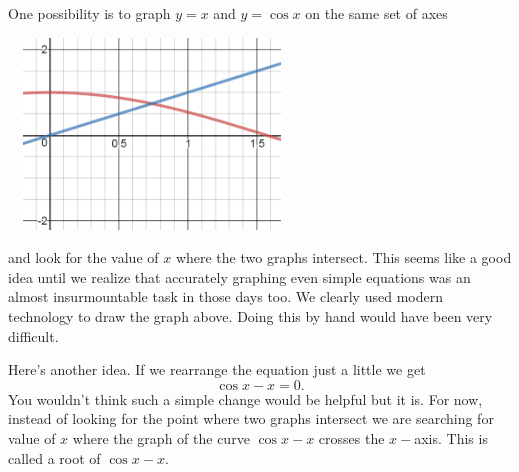 One possibility is to graph $y=x$ and $y=\cos x$ on the same set of
axes\\
\centerline{\includegraphics*[height=2in,width=3in]{Figures/cosxeqx}}
and look for the value of $x$ where the two graphs intersect. This
seems like a good idea until we realize that accurately graphing even
simple equations was an almost insurmountable task in those days
too. We clearly used modern technology to draw the graph above. Doing
this by hand would have been very difficult.

Here's another idea. If we rearrange the equation just a little we get 
$$
\cos x -x =0.
$$
You wouldn't think such a simple change would be helpful but it
is. For now, instead of looking for the point where two graphs
intersect we are searching for value of $x$  where the graph of the
curve $\cos x - x$ crosses the $x-$axis. This is called a root of
$\cos x -x.$ 

